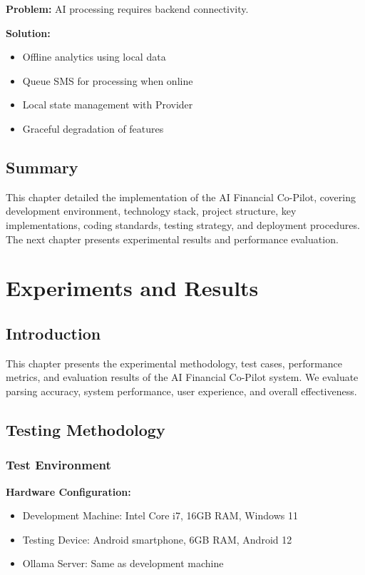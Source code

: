 \documentclass[11pt,a4paper]{report}
\begin{document}
\textbf{Problem:} AI processing requires backend connectivity.

\textbf{Solution:}
\begin{itemize}
    \item Offline analytics using local data
    \item Queue SMS for processing when online
    \item Local state management with Provider
    \item Graceful degradation of features
\end{itemize}

\section{Summary}

This chapter detailed the implementation of the AI Financial Co-Pilot, covering development environment, technology stack, project structure, key implementations, coding standards, testing strategy, and deployment procedures. The next chapter presents experimental results and performance evaluation.

\chapter{Experiments and Results}

\section{Introduction}

This chapter presents the experimental methodology, test cases, performance metrics, and evaluation results of the AI Financial Co-Pilot system. We evaluate parsing accuracy, system performance, user experience, and overall effectiveness.

\section{Testing Methodology}

\subsection{Test Environment}

\textbf{Hardware Configuration:}
\begin{itemize}
    \item Development Machine: Intel Core i7, 16GB RAM, Windows 11
    \item Testing Device: Android smartphone, 6GB RAM, Android 12
    \item Ollama Server: Same as development machine
\end{itemize}
\end{document}
